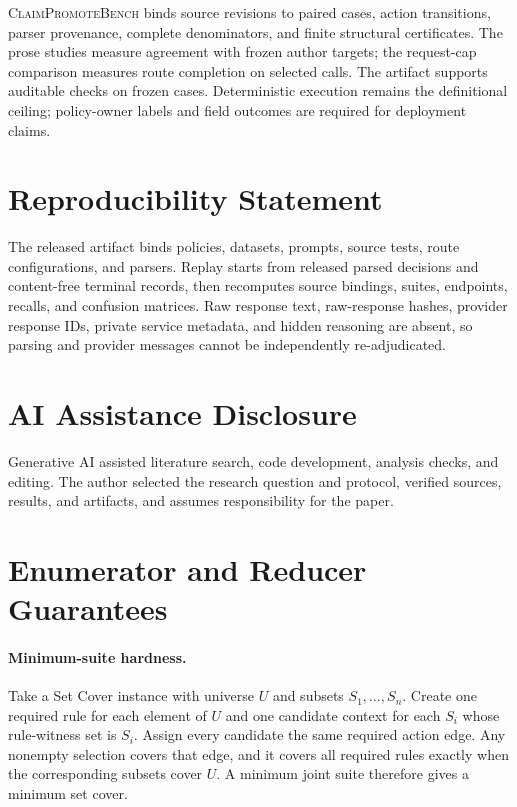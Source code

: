 \documentclass[10pt]{article}
\newcommand{\cpb}{\textsc{ClaimPromoteBench}\xspace}
\begin{document}
\cpb binds source revisions to paired cases, action transitions, parser provenance, complete
denominators, and finite structural certificates. The prose studies measure agreement with frozen
author targets; the request-cap comparison measures route completion on selected calls. The
artifact supports auditable checks on frozen cases. Deterministic execution remains the
definitional ceiling; policy-owner labels and field outcomes are required for deployment claims.

\section{Reproducibility Statement}

The released artifact binds policies, datasets, prompts, source tests, route configurations, and
parsers. Replay starts from released parsed decisions and content-free terminal records, then
recomputes source bindings, suites, endpoints, recalls, and confusion matrices. Raw response text,
raw-response hashes, provider response IDs, private service metadata, and hidden reasoning are
absent, so parsing and provider messages cannot be independently re-adjudicated.

\section{AI Assistance Disclosure}

Generative AI assisted literature search, code development, analysis checks, and editing. The author
selected the research question and protocol, verified sources, results, and artifacts, and assumes
responsibility for the paper.




\appendix
\section{Enumerator and Reducer Guarantees}
\label{app:enumerator}

\paragraph{Minimum-suite hardness.}
Take a Set Cover instance with universe $U$ and subsets $S_1,\ldots,S_n$. Create one required rule
for each element of $U$ and one candidate context for each $S_i$ whose rule-witness set is $S_i$.
Assign every candidate the same required action edge. Any nonempty selection covers that edge, and
it covers all required rules exactly when the corresponding subsets cover $U$. A minimum joint
suite therefore gives a minimum set cover.
\end{document}
